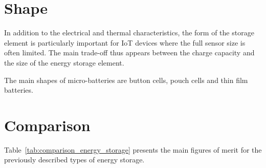 \documentclass{EPL-master-thesis-covers-EN}
\begin{document}
\section{Shape}

In addition to the electrical and thermal characteristics, the form of the storage element is particularly important for IoT devices where the full sensor size is often limited. The main trade-off thus appears between the charge capacity and the size of the energy storage element.

The main shapes of micro-batteries are button cells, pouch cells and thin film batteries.

\section{Comparison}

Table~\ref{tab:comparison_energy_storage} presents the main figures of merit for the previously described types of energy storage.
\end{document}
